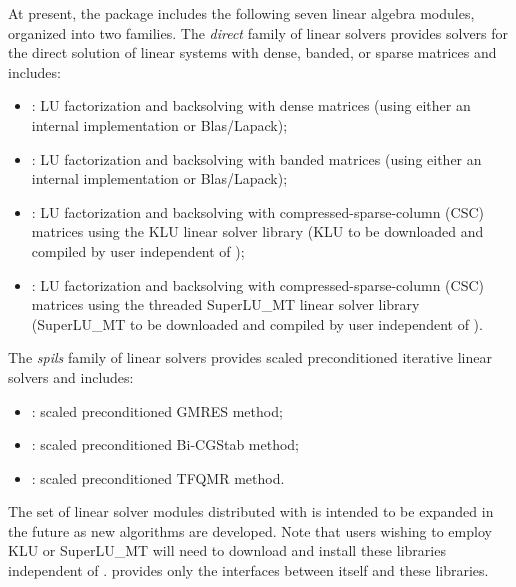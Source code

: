 At present, the package includes the following seven {\ida} linear algebra
modules, organized into two families. The {\em direct} family of linear
solvers provides solvers for the direct solution of linear systems with
dense, banded, or sparse matrices and includes:
\begin{itemize} 
\item {\idadense}: LU factorization and backsolving with dense matrices
  (using either an internal implementation or Blas/Lapack); 
\item {\idaband}: LU factorization and backsolving with banded matrices
  (using either an internal implementation or Blas/Lapack); 
\item {\idaklu}: LU factorization and backsolving with
  compressed-sparse-column (CSC) matrices using the KLU linear solver
  library \cite{DaPa:10,KLU_site} (KLU to be downloaded and compiled by user independent 
  of {\ida});
\item {\idasuperlumt}: LU factorization and backsolving with
  compressed-sparse-column (CSC) matrices using the threaded
  SuperLU\_MT linear solver library \cite{Li:05,DGL:99,SuperLUMT_site} 
  (SuperLU\_MT to be downloaded and compiled by user independent 
  of {\ida}).
\end{itemize}
The {\em spils} family of linear solvers provides scaled preconditioned
iterative linear solvers and includes:
\begin{itemize} 
\item {\idaspgmr}: scaled preconditioned GMRES method;
\item {\idaspbcg}: scaled preconditioned Bi-CGStab method;
\item {\idasptfqmr}: scaled preconditioned TFQMR method.
\end{itemize}
The set of linear solver modules distributed with {\ida} is intended to be expanded in the
future as new algorithms are developed.
Note that users wishing to employ KLU or 
SuperLU\_MT will need to download and install these libraries independent of {\sundials}.
{\sundials} provides only the interfaces between itself and these libraries.

